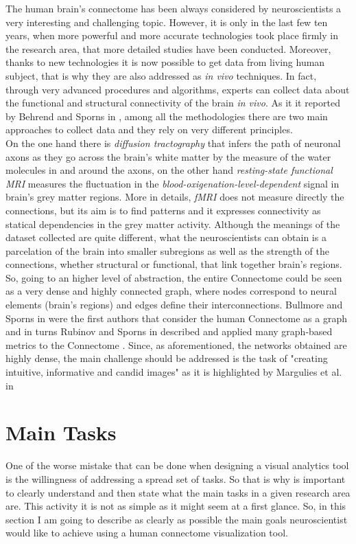 \documentclass{article}
\begin{document}
\begin{multicols}{2}
The human brain's connectome has been always considered by neuroscientists a very interesting and challenging topic. However, it is only in the last few ten years, when more powerful and more accurate technologies took place firmly in the research area, that more detailed studies have been conducted. Moreover, thanks to new technologies it is now possible to get data from living human subject, that is why they are also addressed as \textit{in vivo} techniques. In fact, through very advanced procedures and algorithms, experts can collect data about the functional and structural connectivity of the brain \textit{in vivo}. As it it reported by Behrend and Sporns in \cite{humanConnectomics}, among all the methodologies there are two main approaches to collect data and they rely on very different principles. \\
On the one hand there is \textit{diffusion tractography} that infers the path of neuronal axons as they go across the brain's white matter by the measure of the water molecules in and around the axons, on the other hand \textit{resting-state functional MRI} measures the fluctuation in the \textit{blood-oxigenation-level-dependent} signal in brain's grey matter regions. More in details, \textit{fMRI} does not measure directly the connections, but its aim is to find patterns and it expresses connectivity as statical dependencies in the grey matter activity. Although the meanings of the dataset collected are quite different, what the neuroscientists can obtain is a parcelation of the brain into smaller subregions as well as the strength of the connections, whether structural or functional, that link together brain's regions. So, going to an higher level of abstraction, the entire Connectome could be seen as a very dense and highly connected graph, where nodes correspond to neural elements (brain's regions) and edges define their interconnections. Bullmore and Sporns in \cite{bullmore2009complex} were the first authors that consider the human Connectome as a graph and in turns Rubinov and Sporns in \cite{complexNetworkMeasures} described and applied many graph-based metrics to the Connectome . Since, as aforementioned, the networks obtained are highly dense, the main challenge should be addressed is the task of "creating intuitive, informative and candid images" as it is highlighted by Margulies et al. in \cite{visualizingHumanConnectome}

\section{Main Tasks}
\label{sec:mainTasks}
One of the worse mistake that can be done when designing a visual analytics tool is the willingness of addressing a spread set of tasks. So that is why is important to clearly understand and then state what the main tasks in a given research area are. This activity it is not as simple as it might seem at a first glance. So, in this section I am going to describe as clearly as possible the main goals neuroscientist would like to achieve using a human connectome visualization tool.\\


\end{multicols}
\end{document}
